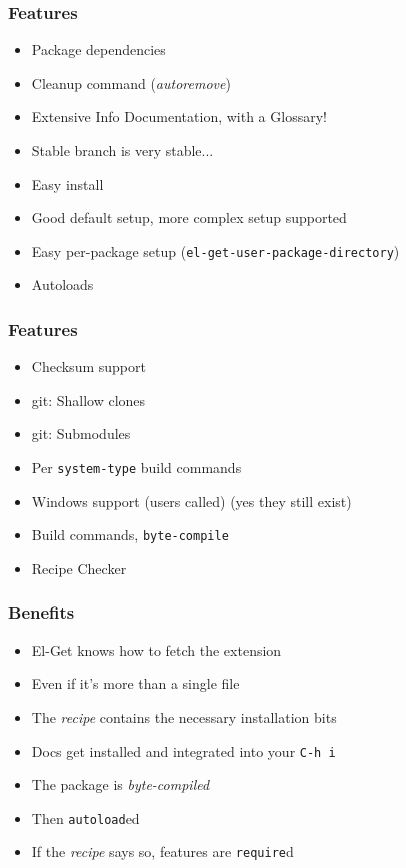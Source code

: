 \documentclass{beamer}
\begin{document}
\begin{frame}
  \frametitle{Features}

  \vfill

  \begin{itemize}
   \item Package dependencies
   \item Cleanup command (\textit{autoremove})
   \item Extensive Info Documentation, with a Glossary!
   \item Stable branch is very stable...
   \item Easy install
   \item Good default setup, more complex setup supported
   \item Easy per-package setup (\texttt{el-get-user-package-directory})
   \item Autoloads
  \end{itemize}
\end{frame}

\begin{frame}
  \frametitle{Features}

  \vfill

  \begin{itemize}
   \item Checksum support
   \item git: Shallow clones
   \item git: Submodules
   \item Per \texttt{system-type} build commands
   \item Windows support (users called) (yes they still exist)
   \item Build commands, \texttt{byte-compile}
   \item Recipe Checker
  \end{itemize}
\end{frame}

\begin{frame}
  \frametitle{Benefits}

  \vfill

  \begin{itemize}
   \item El-Get knows how to fetch the extension
   \item Even if it's more than a single file
   \item The \textit{recipe} contains the necessary installation bits
   \item Docs get installed and integrated into your \texttt{C-h i}
   \item The package is \textit{byte-compiled}
   \item Then \texttt{autoload}ed
   \item If the \textit{recipe} says so, features are \texttt{require}d
  \end{itemize}
\end{frame}
\end{document}
